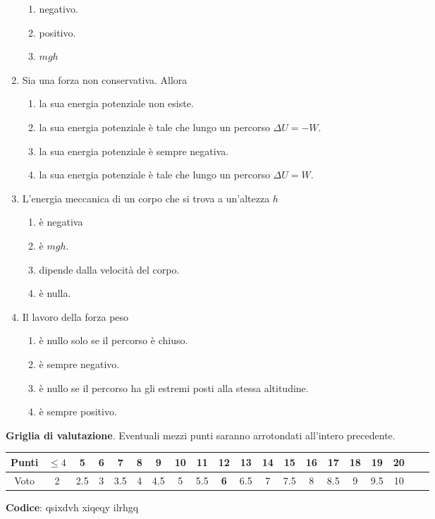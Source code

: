 \documentclass{article}
\begin{document}
\begin{enumerate}
\begin{enumerate}[label=\Alph*.]
    \item negativo.
    \item positivo.
    \item $mgh$
  \end{enumerate}
  \item Sia  una forza non conservativa. Allora
  \begin{enumerate}[label=\Alph*.]
    \item la sua energia potenziale non esiste.
    \item la sua energia potenziale è tale che lungo un percorso $\Delta U=-W$.
    \item la sua energia potenziale è sempre negativa.
    \item la sua energia potenziale è tale che lungo un percorso $\Delta U=W$.
  \end{enumerate}
  \item L'energia meccanica di un corpo che si trova a un'altezza $h$
  \begin{enumerate}[label=\Alph*.]
    \item è negativa
    \item è $mgh$.
    \item dipende dalla velocità del corpo.
    \item è nulla.
  \end{enumerate}
  \item Il lavoro della forza peso
  \begin{enumerate}[label=\Alph*.]
    \item è nullo solo se il percorso è chiuso.
    \item è sempre negativo.
    \item è nullo se il percorso ha gli estremi posti alla stessa altitudine.
    \item è sempre positivo.
  \end{enumerate}
\end{enumerate}








\newpage \maketitle \centering \textbf{Griglia di valutazione}. Eventuali mezzi punti saranno arrotondati all'intero precedente. \begin{table}[h]     \centering \begin{tabular}{|c|c|c|c|c|c|c|c|c|c|c|c|c|c|c|c|c|c|c|c|} \hline Punti &  $\leq 4$ & 5 & 6 & 7 & 8 & 9 & 10 & 11 & \textbf{12} & 13 & 14 & 15 & 16 & 17 & 18 & 19 & 20 \\ \hline Voto & 2 & 2.5 & 3 & 3.5 & 4 & 4.5 & 5 & 5.5 & \textbf{6} & 6.5 & 7 & 7.5 & 8 & 8.5 & 9 & 9.5 & 10 \\ \hline \end{tabular} \end{table}
\textbf{Codice}: qsixdvh xiqeqy ilrhgq
\end{document}

